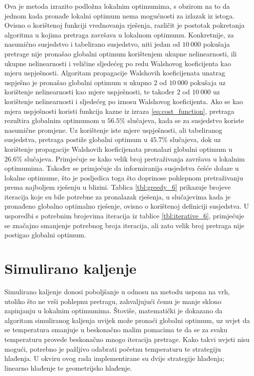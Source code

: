 Ova je metoda izrazito podložna lokalnim optimumima, s obzirom na to da jednom kada pronađe lokalni optimum nema mogućnosti za izlazak iz istoga.
Ovisno o korištenoj funkciji vrednovanja rješenja, različit je postotak pokretanja algoritma u kojima pretraga završava u lokalnom optimumu.
Konkretnije, za nasumično susjedstvo i tabelirano susjedstvo, niti jedan od $10\:000$ pokušaja pretrage nije pronašao globalni optimum korištenjem ukupne nelinearnosti, ili ukupne nelinearnosti i veličine sljedećeg po redu Walshovog koeficijenta kao mjeru uspješnosti.
Algoritam propagacije Walshovih koeficijenata unatrag uspješno je pronašao globalni optimum u ukupno $2$ od $10\:000$ pokušaja uz korištenje nelinearnosti kao mjere uspješnosti, te također $2$ od $10\:000$ uz korištenje nelinearnosti i sljedećeg po iznosu Walshovog koeficijenta.
Ako se kao mjera uspješnosti koristi funkcija kazne iz izraza \eqref{eq:cost_function}, pretraga rezultira globalnim optimumom u $56.5\%$ slučajeva, kada se za susjedstvo koriste nasumične promjene.
Uz korištenje iste mjere uspješnosti, ali tabeliranog susjedstva, pretraga postiže globalni optimum u $45.7\%$ slučajeva, dok uz korištenje propagacije Walshovih koeficijenata pronalazi globalni optimum u $26.6\%$ slučajeva.
Primjećuje se kako velik broj pretraživanja završava u lokalnim optimumima.
Također se primjećuje da informiranija susjedstva češće dolaze u lokalne optimume, što je posljedica toga što doprinose pohlepnom pretraživanju prema najboljem rješenju u blizini.
Tablica \ref{tbl:greedy_6} prikazuje brojeve iteracija koje su bile potrebne za pronalazak rješenja, u slučajevima kada je pronađeno globalno optimalno rješenje, ovisno o korištenoj definiciji susjedstva.
U usporedbi s potrebnim brojevima iteracija iz tablice \ref{tbl:iterative_6}, primjećuje se značajno smanjenje potrebnog broja iteracija, ali zato velik broj pretraga nije postigao globalni optimum.

\section{Simulirano kaljenje}
Simulirano kaljenje donosi poboljšanje u odnosu na metodu uspona na vrh, utoliko što ne vrši pohlepnu pretragu, zahvaljujući čemu je manje sklono zapinjanju u lokalnim optimumima.
Štoviše, matematički je dokazano da algoritam simuliranog kaljenja uvijek može pronaći globalni optimum, uz uvjet da se temperatura smanjuje u beskonačno malim pomacima te da se za svaku temperaturu provede beskonačno mnogo iteracija pretrage.
Kako takvi uvjeti nisu mogući, potrebno je pažljivo odabrati početnu temperaturu te strategiju hlađenja.
U okviru ovog rada implementirane su dvije strategije hlađenja; linearno hlađenje te geometrijsko hlađenje.

